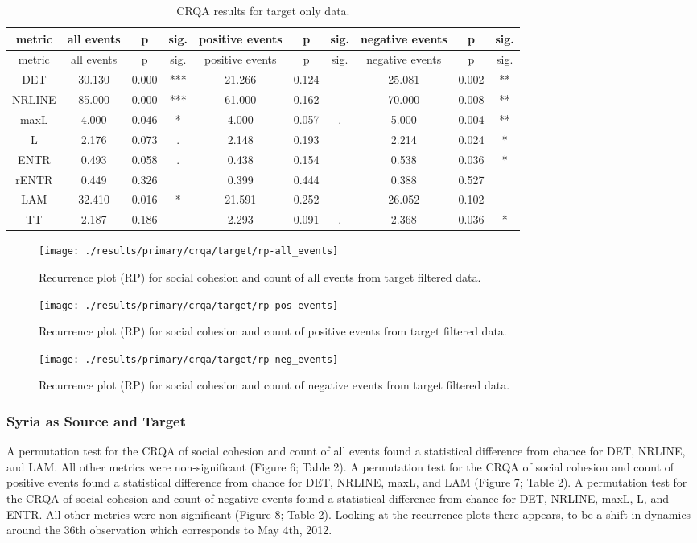 \documentclass[english,man]{apa6}
\begin{document}
\begin{longtable}[]{@{}cccccccccc@{}}
\caption{CRQA results for target only data.}\tabularnewline
\toprule
metric & all events & p & sig. & positive events & p & sig. & negative events & p & sig.\tabularnewline
\midrule
\endfirsthead
\toprule
metric & all events & p & sig. & positive events & p & sig. & negative events & p & sig.\tabularnewline
\midrule
\endhead
DET & 30.130 & 0.000 & *** & 21.266 & 0.124 & & 25.081 & 0.002 & **\tabularnewline
NRLINE & 85.000 & 0.000 & *** & 61.000 & 0.162 & & 70.000 & 0.008 & **\tabularnewline
maxL & 4.000 & 0.046 & * & 4.000 & 0.057 & . & 5.000 & 0.004 & **\tabularnewline
L & 2.176 & 0.073 & . & 2.148 & 0.193 & & 2.214 & 0.024 & *\tabularnewline
ENTR & 0.493 & 0.058 & . & 0.438 & 0.154 & & 0.538 & 0.036 & *\tabularnewline
rENTR & 0.449 & 0.326 & & 0.399 & 0.444 & & 0.388 & 0.527 &\tabularnewline
LAM & 32.410 & 0.016 & * & 21.591 & 0.252 & & 26.052 & 0.102 &\tabularnewline
TT & 2.187 & 0.186 & & 2.293 & 0.091 & . & 2.368 & 0.036 & *\tabularnewline
\bottomrule
\end{longtable}

\begin{figure}
\texttt{[image: ./results/primary/crqa/target/rp-all\_events]} \caption{Recurrence plot (RP) for social cohesion and count of all events from target filtered data.}\label{fig:plot-rp-targ-all}
\end{figure}

\begin{figure}
\texttt{[image: ./results/primary/crqa/target/rp-pos\_events]} \caption{Recurrence plot (RP) for social cohesion and count of positive events from target filtered data.}\label{fig:plot-rp-targ-pos}
\end{figure}

\begin{figure}
\texttt{[image: ./results/primary/crqa/target/rp-neg\_events]} \caption{Recurrence plot (RP) for social cohesion and count of negative events from target filtered data.}\label{fig:plot-rp-targ-neg}
\end{figure}

\hypertarget{syria-as-source-and-target}{%
\subsubsection{Syria as Source and Target}\label{syria-as-source-and-target}}

A permutation test for the CRQA of social cohesion and count of all events found a statistical difference from chance for DET, NRLINE, and LAM. All other metrics were non-significant (Figure 6; Table 2). A permutation test for the CRQA of social cohesion and count of positive events found a statistical difference from chance for DET, NRLINE, maxL, and LAM (Figure 7; Table 2). A permutation test for the CRQA of social cohesion and count of negative events found a statistical difference from chance for DET, NRLINE, maxL, L, and ENTR. All other metrics were non-significant (Figure 8; Table 2). Looking at the recurrence plots there appears, to be a shift in dynamics around the 36th observation which corresponds to May 4th, 2012.
\end{document}
